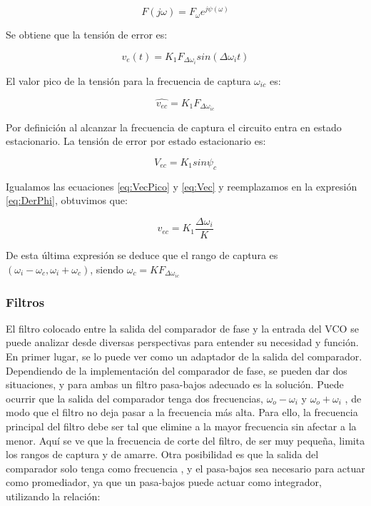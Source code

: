 \begin{equation}
F(j\omega) = F_{\omega}e^{j\psi(\omega)}
\end{equation}

Se obtiene que la tensión de error es:

\begin{equation}
v_e(t) = K_1F_{\Delta\omega_i}sin(\Delta\omega_i t)
\end{equation}

El valor pico de la tensión para la frecuencia de captura $\omega_{ic}$ es:

\begin{equation}
	\hat{v_{ec}} = K_1F_{\Delta\omega_{ic}}
	\label{eq:VecPico}
\end{equation}

Por definición al alcanzar la frecuencia de captura el circuito entra en estado estacionario. La tensión de error por estado estacionario es:

\begin{equation}
	V_{ec} = K_1 sin\psi_c
	\label{eq:Vec}
\end{equation}

Igualamos las ecuaciones \ref{eq:VecPico} y \ref{eq:Vec} y reemplazamos en la expresión \ref{eq:DerPhi}, obtuvimos que:

\begin{equation}
	v_{ec} = K_1 \frac{\Delta\omega_i}{K}
	\label{eq:finalVec}
\end{equation}

De esta última expresión se deduce que el rango de captura es $(\omega_i-\omega_c , \omega_i+\omega_c)$, siendo $\omega_c = KF_{\Delta\omega_{ic}}$

\subsubsection{Filtros}

El filtro colocado entre la salida del comparador de fase y la entrada del VCO se puede analizar desde diversas perspectivas para entender su necesidad y función.
En primer lugar, se lo puede ver como un adaptador de la salida del comparador. Dependiendo de la implementación del comparador de fase, se pueden dar dos situaciones, y para ambas un filtro pasa-bajos adecuado es la solución.
Puede ocurrir que la salida del comparador tenga dos frecuencias, $\omega_o - \omega_i$ y $\omega_o + \omega_i$ , de modo que el filtro no deja pasar a la frecuencia más alta. Para ello, la frecuencia principal del filtro debe ser tal que elimine a la mayor frecuencia sin afectar a la menor. Aquí se ve que la frecuencia de corte del filtro, de ser muy pequeña, limita los rangos de captura y de amarre.
Otra posibilidad es que la salida del comparador solo tenga como frecuencia , y el pasa-bajos sea necesario para actuar como promediador, ya que un pasa-bajos puede actuar como integrador, utilizando la relación:


